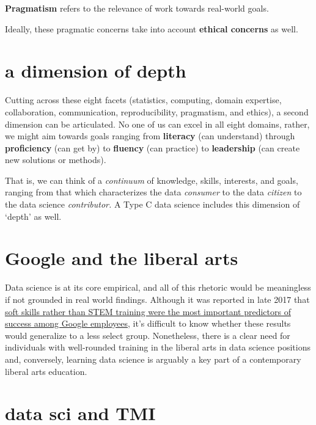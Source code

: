 \documentclass[
  openany]{book}
\begin{document}
\textbf{Pragmatism} refers to the relevance of work towards real-world goals.

Ideally, these pragmatic concerns take into account \textbf{ethical concerns} as well.

\hypertarget{a-dimension-of-depth}{%
\section{a dimension of depth}\label{a-dimension-of-depth}}

Cutting across these eight facets (statistics, computing, domain expertise, collaboration, communication, reproducibility, pragmatism, and ethics), a second dimension can be articulated. No one of us can excel in all eight domains, rather, we might aim towards goals ranging from \textbf{literacy} (can understand) through \textbf{proficiency} (can get by) to \textbf{fluency} (can practice) to \textbf{leadership} (can create new solutions or methods).

That is, we can think of a \emph{continuum} of knowledge, skills, interests, and goals, ranging from that which characterizes the data \emph{consumer} to the data \emph{citizen} to the data science \emph{contributor.} A Type C data science includes this dimension of `depth' as well.

\hypertarget{google-and-the-liberal-arts}{%
\section{Google and the liberal arts}\label{google-and-the-liberal-arts}}

Data science is at its core empirical, and all of this rhetoric would be meaningless if not grounded in real world findings. Although it was reported in late 2017 that \href{https://www.washingtonpost.com/news/answer-sheet/wp/2017/12/20/the-surprising-thing-google-learned-about-its-employees-and-what-it-means-for-todays-students/?sw_bypass=true\&utm_term=.23e48235d66e}{soft skills rather than STEM training were the most important predictors of success among Google employees}, it's difficult to know whether these results would generalize to a less select group. Nonetheless, there is a clear need for individuals with well-rounded training in the liberal arts in data science positions and, conversely, learning data science is arguably a key part of a contemporary liberal arts education.

\hypertarget{data-sci-and-tmi}{%
\section{data sci and TMI}\label{data-sci-and-tmi}}
\end{document}
